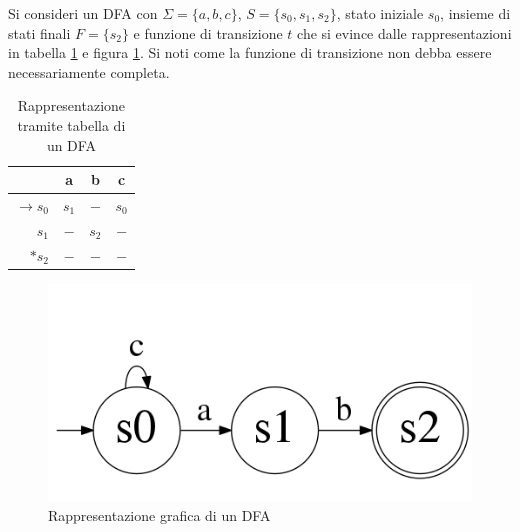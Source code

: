 \begin{ex}
Si consideri un DFA con $\Sigma = \{ a,b,c\}$, $S = \{ s_0,s_1,s_2\}$, stato iniziale $s_0$, insieme di stati finali $F = \{s_2\}$ e funzione di transizione $t$ che si evince dalle rappresentazioni in tabella \ref{tab:dfa} e figura \ref{fig:dfa}.
Si noti come la funzione di transizione non debba essere necessariamente completa.

\begin{table}[htbp]
\begin{center}
\begin{tabular}{r | c c c}
& a & b & c \\ \hline
$\rightarrow s_0$ & $s_1$ & $-$ & $s_0$ \\
$s_1$ & $-$ & $s_2$ & $-$\\
$*s_2$ & $-$ & $-$ & $-$\\ 
\end{tabular}
\caption{Rappresentazione tramite tabella di un DFA}
\label{tab:dfa}
\end{center}
\end{table}


\begin{figure}[htbp]
\centering
\includegraphics[scale=0.3]{./Img/automi/ex1.png}
\caption{Rappresentazione grafica di un DFA}
\label{fig:dfa}
\end{figure}

\end{ex}

